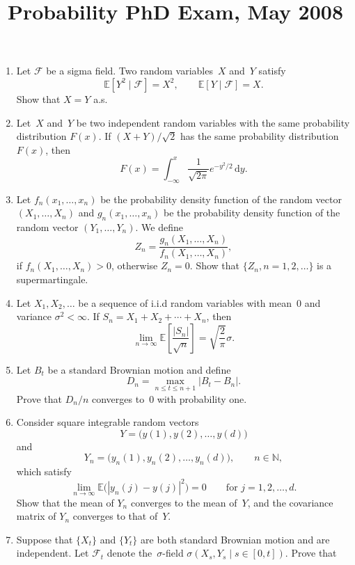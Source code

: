 \documentclass[11pt,letterpaper]{article}
\title{Probability PhD Exam, May 2008}
\author{}
\date{}
\newenvironment{examproblems}[2]{%
  \def\ProblemHeadingTag{#2}%
  \AssignTaggingSocketPlug{block/list/label}{examproblem}%
  \begin{enumerate}%
  \setcounter{enumi}{#1}%
  \renewcommand{\labelenumi}{\textbf{\theenumi.}}%
  \setlength{\topsep}{0.35em}%
  \setlength{\partopsep}{0pt}%
  \setlength{\itemsep}{0.48em}%
  \setlength{\parsep}{0.18em}%
}{\end{enumerate}}
\begin{document}
\maketitle
\thispagestyle{empty}
\begin{examproblems}{0}{H2}
\def\ProblemHeadingText{Problem 1.}
\item
Let \(\mathcal F\) be a sigma field. Two random variables~\(X\) and~\(Y\) satisfy
\[
\mathbb E[Y^2\mid\mathcal F]=X^2,\qquad \mathbb E[Y\mid\mathcal F]=X.
\]
 Show that \(X=Y\) a.s.
\def\ProblemHeadingText{Problem 2.}
\item
Let~\(X\) and~\(Y\) be two independent random variables with the same probability distribution \(F(x)\). If \((X+Y)/\sqrt{2}\) has the same probability distribution \(F(x)\), then
\[
F(x)=\int_{-\infty}^{x}\frac{1}{\sqrt{2\pi}}e^{-y^2/2}\,\mathrm{d}y.
\]
\def\ProblemHeadingText{Problem 3.}
\item
Let \(f_n(x_1,\ldots,x_n)\) be the probability density function of the random vector \((X_1,\ldots,X_n)\) and \(g_n(x_1,\ldots,x_n)\) be the probability density function of the random vector \((Y_1,\ldots,Y_n)\). We define
\[
Z_n=\frac{g_n(X_1,\ldots,X_n)}{f_n(X_1,\ldots,X_n)},
\]
 if \(f_n(X_1,\ldots,X_n)>0\), otherwise \(Z_n=0\). Show that \(\{Z_n,n=1,2,\ldots\}\) is a supermartingale.
\def\ProblemHeadingText{Problem 4.}
\item
Let \(X_1,X_2,\ldots\) be a sequence of i.i.d random variables with mean~\(0\) and variance \(\sigma^2<\infty\). If \(S_n=X_1+X_2+\cdots+X_n\), then
\[
\lim_{n\to\infty}\mathbb E\left[\frac{|S_n|}{\sqrt n}\right]=\sqrt{\frac{2}{\pi}}\sigma.
\]
\def\ProblemHeadingText{Problem 5.}
\item
Let \(B_t\) be a standard Brownian motion and define
\[
D_n=\max_{n\le t\le n+1}|B_t-B_n|.
\]
 Prove that \(D_n/n\) converges to~\(0\) with probability one.
\def\ProblemHeadingText{Problem 6.}
\item
Consider square integrable random vectors
\[
Y=\bigl(y(1),y(2),\ldots,y(d)\bigr)
\]
 and
\[
Y_n=\bigl(y_n(1),y_n(2),\ldots,y_n(d)\bigr),\qquad n\in\mathbb N,
\]
 which satisfy
\[
\lim_{n\to\infty}\mathbb E\bigl(|y_n(j)-y(j)|^2\bigr)=0\qquad\text{for }j=1,2,\ldots,d.
\]
 Show that the mean of \(Y_n\) converges to the mean of~\(Y\), and the covariance matrix of \(Y_n\) converges to that of~\(Y\).
\def\ProblemHeadingText{Problem 7.}
\item
Suppose that \(\{X_t\}\) and \(\{Y_t\}\) are both standard Brownian motion and are independent. Let \(\mathcal F_t\) denote the~\(\sigma\)-field \(\sigma(X_s,Y_s\mid s\in[0,t])\). Prove that

\end{examproblems}
\end{document}
